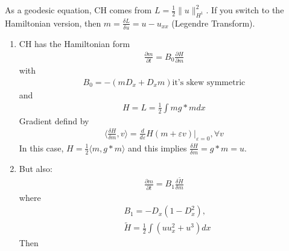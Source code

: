 \documentclass[12pt,reqno]{amsart}
\numberwithin{equation}{section}  %
\newcommand{\p}{\partial}
\newcommand{\ee}{\varepsilon}
\begin{document}
%
%
As a geodesic equation, CH comes from $L = \frac{1}{2}\|u \|_{H^{1}}^{2}$. If you
switch to the Hamiltonian version, then $m = \frac{\delta L}{\delta u} = u -
u_{xx}$ (Legendre Transform).
\begin{enumerate}
  \item CH has the Hamiltonian form
    \begin{equation*}
      \begin{split}
	\frac{\p m}{\p t} = B_{0} \frac{\p H}{\p m}
      \end{split}
    \end{equation*}
    with %
    \begin{equation*}
      \begin{split}
	B_{0} = -(m D_{x} + D_{x}m) \text{it's skew symmetric}
      \end{split}
    \end{equation*}
    and %
    \begin{equation*}
      \begin{split}
	H = L = \frac{1}{2} \int m g*m dx
      \end{split}
    \end{equation*}
    Gradient defind by
    \begin{equation*}
      \begin{split}
	\langle \frac{\delta H}{\delta m}, v  \rangle  = \frac{d}{d \ee} H(m + \ee
	v) |_{\ee = 0}, \forall v
      \end{split}
    \end{equation*}
    In this case, $H = \frac{1}{2} \langle m, g*m \rangle $ and this implies
    $\frac{\delta H}{\delta m} = g*m =u$.
  \item But also:
    \begin{equation*}
      \begin{split}
	\frac{\p m}{\p t} = B_{1} \frac{\delta \tilde{H}}{\delta m}
      \end{split}
    \end{equation*}
    where %
    \begin{equation*}
      \begin{split}
	& B_{1} = -D_{x}(1 - D_{x}^{2}), \\
	& \tilde{H} = \frac{1}{2} \int (u u_{x}^{2} + u^{3})dx
      \end{split}
    \end{equation*}
    Then 
    \begin{equation*}

\end{equation*}
\end{enumerate}
\end{document}
